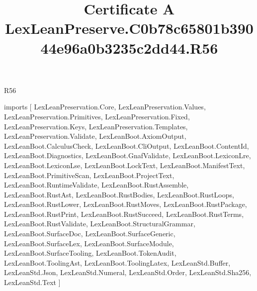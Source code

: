 \begin{lexlean}{R56}
\title{Certificate A LexLeanPreserve.C0b78c65801b39044e96a0b3235c2dd44.R56}
\begin{coremodule}
imports [
  LexLeanPreservation.Core,
  LexLeanPreservation.Values,
  LexLeanPreservation.Primitives,
  LexLeanPreservation.Fixed,
  LexLeanPreservation.Keys,
  LexLeanPreservation.Templates,
  LexLeanPreservation.Validate,
  LexLeanBoot.AxiomOutput,
  LexLeanBoot.CalculusCheck,
  LexLeanBoot.CliOutput,
  LexLeanBoot.ContentId,
  LexLeanBoot.Diagnostics,
  LexLeanBoot.GnafValidate,
  LexLeanBoot.LexiconLre,
  LexLeanBoot.LexiconLse,
  LexLeanBoot.LockText,
  LexLeanBoot.ManifestText,
  LexLeanBoot.PrimitiveScan,
  LexLeanBoot.ProjectText,
  LexLeanBoot.RuntimeValidate,
  LexLeanBoot.RustAssemble,
  LexLeanBoot.RustAst,
  LexLeanBoot.RustBodies,
  LexLeanBoot.RustLoops,
  LexLeanBoot.RustLower,
  LexLeanBoot.RustMoves,
  LexLeanBoot.RustPackage,
  LexLeanBoot.RustPrint,
  LexLeanBoot.RustSucceed,
  LexLeanBoot.RustTerms,
  LexLeanBoot.RustValidate,
  LexLeanBoot.StructuralGrammar,
  LexLeanBoot.SurfaceDoc,
  LexLeanBoot.SurfaceGeneric,
  LexLeanBoot.SurfaceLex,
  LexLeanBoot.SurfaceModule,
  LexLeanBoot.SurfaceTooling,
  LexLeanBoot.TokenAudit,
  LexLeanBoot.ToolingAst,
  LexLeanBoot.ToolingLatex,
  LexLeanStd.Buffer,
  LexLeanStd.Json,
  LexLeanStd.Numeral,
  LexLeanStd.Order,
  LexLeanStd.Sha256,
  LexLeanStd.Text
]


\end{coremodule}
\end{lexlean}
